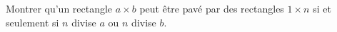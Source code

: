 Montrer qu'un rectangle $a \times b$ peut être pavé par des rectangles $1 \times n$ si et seulement si $n$ divise $a$ ou $n$ divise $b$.
